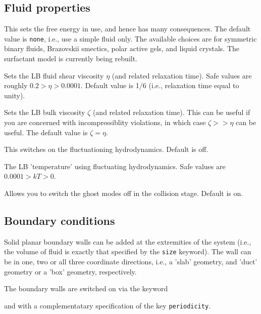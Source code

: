 \subsection{Fluid properties}


This sets the free energy in use, and hence has many consequences.
The default value is \texttt{none}, i.e., use a simple fluid only.
The available choices are for symmetric binary fluids, Brazovskii
smectics, polar active gels, and liquid crystals. The surfactant
model is currently being rebuilt.


Sets the LB fluid shear viscosity $\eta$ (and related relaxation time).
Safe values are roughly $0.2 > \eta > 0.0001 $. Default value is 1/6
(i.e., relaxation time equal to unity).


Sets the LB bulk viscosity $\zeta$ (and related relaxation time).
This can be useful if you are concerned with incompressiblity
violations, in which case $\zeta >> \eta$ can be useful. The
default value is $\zeta = \eta$.


This switches on the fluctuationing hydrodynamics. Default is off.


The LB 'temperature' using fluctuating hydrodynamics. Safe values
are $0.0001 > kT > 0$. 


Allows you to switch the ghost modes off in the collision stage.
Default is on.


\subsection{Boundary conditions}

Solid planar boundary walls can be added at the extremities of the
system (i.e., the volume of fluid is exactly that specified by
the \texttt{size} keyword). The wall can be in one, two or all three
coordinate directions, i.e., a 'slab' geometry, and 'duct' geometry
or a 'box' geometry, respectively.

The boundary walls are switched on via the keyword


and with a complementatary specification of the key \texttt{periodicity}.

